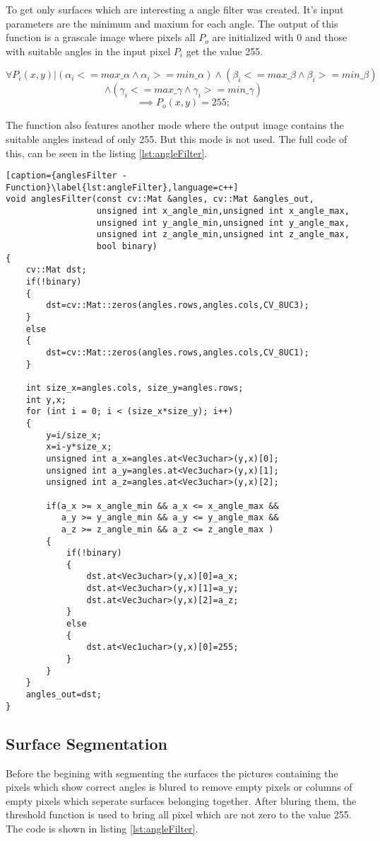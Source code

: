To get only surfaces which are interesting a angle filter was created. It's input parameters
are the minimum and maxium for each angle. The output of this function is a grascale image
where pixels all $P_o$ are initialized with 0 and those with suitable angles 
in the input pixel $P_i$ get the value 255.

 \[
 	\forall P_i(x,y) | (\alpha_i<=max\_\alpha \wedge \alpha_i>=min\_\alpha) \wedge
 	(\beta_i<=max\_\beta \wedge \beta_i>=min\_\beta) \]\[ \wedge (\gamma_i<=max\_\gamma \wedge \gamma_i>=min\_\gamma)
 \]\[
 	\implies P_o(x,y) = 255;
 \] 

The function also features another mode where the output image contains the suitable angles instead of only 255.
But this mode is not used. The full code of this, can be seen in the listing \vref{lst:angleFilter}.

\begin{lstlisting}[caption={anglesFilter - Function}\label{lst:angleFilter},language=c++]
void anglesFilter(const cv::Mat &angles, cv::Mat &angles_out, 
                  unsigned int x_angle_min,unsigned int x_angle_max,
                  unsigned int y_angle_min,unsigned int y_angle_max,
                  unsigned int z_angle_min,unsigned int z_angle_max, 
                  bool binary)
{
	cv::Mat dst;
	if(!binary)
	{
		dst=cv::Mat::zeros(angles.rows,angles.cols,CV_8UC3);
	}
	else
	{
		dst=cv::Mat::zeros(angles.rows,angles.cols,CV_8UC1);
	}

	int size_x=angles.cols, size_y=angles.rows;
	int y,x;
	for (int i = 0; i < (size_x*size_y); i++)
	{
		y=i/size_x;
		x=i-y*size_x;
		unsigned int a_x=angles.at<Vec3uchar>(y,x)[0];
		unsigned int a_y=angles.at<Vec3uchar>(y,x)[1];
		unsigned int a_z=angles.at<Vec3uchar>(y,x)[2];

		if(a_x >= x_angle_min && a_x <= x_angle_max && 
	 	   a_y >= y_angle_min && a_y <= y_angle_max && 
	 	   a_z >= z_angle_min && a_z <= z_angle_max )
		{
			if(!binary)
			{
				dst.at<Vec3uchar>(y,x)[0]=a_x;
				dst.at<Vec3uchar>(y,x)[1]=a_y;
				dst.at<Vec3uchar>(y,x)[2]=a_z;
			}
			else
			{
				dst.at<Vec1uchar>(y,x)[0]=255;
			}
		}
	}
	angles_out=dst;
}
\end{lstlisting}



\subsection{Surface Segmentation}

Before the begining with segmenting the surfaces the pictures containing the pixels which show correct angles
is blured to remove empty pixels or columns of empty pixels which seperate surfaces belonging together. After
bluring them, the threshold function is used to bring all pixel which are not zero to the value 255. The code is
shown in listing \vref{lst:angleFilter}.

